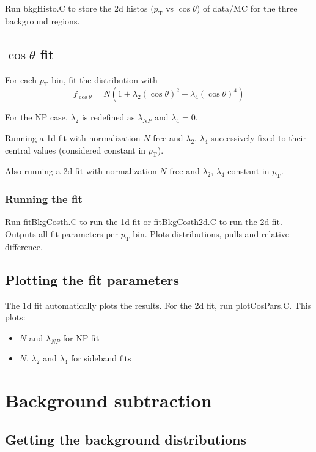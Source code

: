 \documentclass{article}
\newcommand{\pt}{p_\text{T}}
\newcommand{\cost}{\cos\theta}
\begin{document}
Run bkgHisto.C to store the 2d histos ($\pt$ vs $\cost$) of data/MC for the three background regions.

\subsection{$\cost$ fit}

For each $\pt$ bin, fit the distribution with
\begin{equation}
f_{\cost} = N\left(1+\lambda_2(\cost)^2+\lambda_4(\cost)^4\right)
\end{equation}

For the NP case, $\lambda_2$ is redefined as $\lambda_{NP}$ and $\lambda_4=0$.

Running a 1d fit with normalization $N$ free and $\lambda_2$, $\lambda_4$ successively fixed to their central values (considered constant in $\pt$).

Also running a 2d fit with normalization $N$ free and $\lambda_2$, $\lambda_4$ constant in $\pt$.

\subsubsection{Running the fit}

Run fitBkgCosth.C to run the 1d fit or fitBkgCosth2d.C to run the 2d fit. Outputs all fit parameters per $\pt$ bin. Plots distributions, pulls and relative difference.

\subsection{Plotting the fit parameters}

The 1d fit automatically plots the results. For the 2d fit, run plotCosPars.C. This plots:
\begin{itemize}
\item $N$ and $\lambda_{NP}$ for NP fit
\item $N$, $\lambda_2$ and $\lambda_4$ for sideband fits
\end{itemize}

\pagebreak

\section{Background subtraction}

\subsection{Getting the background distributions}
\end{document}
